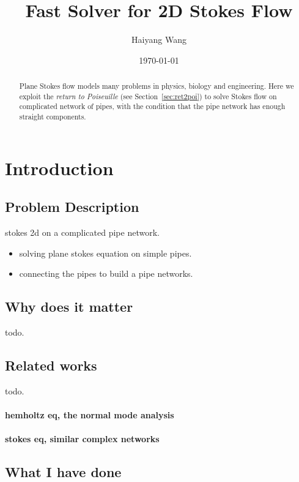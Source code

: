 \documentclass[11pt]{article}
\author{Haiyang Wang}
\date{\today}
\title{Fast Solver for 2D Stokes Flow}
\newtheorem[L]{thm}{Theorem}[section]
\begin{document}
\maketitle

\begin{abstract}
  Plane Stokes flow models many problems in physics, biology and engineering. Here we exploit the \textit{return to Poiseuille} (see Section~\ref{sec:ret2poi}) to solve Stokes flow on complicated network of pipes, with the condition that the pipe network has enough straight components. 
\end{abstract}

\section{Introduction}

\subsection{Problem Description}

stokes 2d on a complicated pipe network. 

\begin{itemize}
  \item solving plane stokes equation on simple pipes.
  \item connecting the pipes to build a pipe networks. 
\end{itemize}

\subsection{Why does it matter}
todo. 
\subsection{Related works}
todo.

\paragraph{hemholtz eq, the normal mode analysis}

\paragraph{stokes eq, similar complex networks}

\subsection{What I have done}
\end{document}
